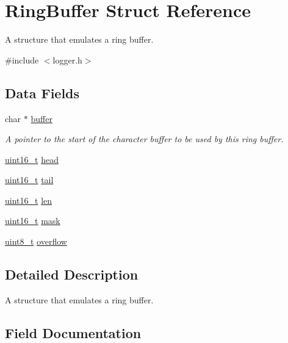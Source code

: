 \hypertarget{structRingBuffer}{\section{\-Ring\-Buffer \-Struct \-Reference}
\label{structRingBuffer}
}


\-A structure that emulates a ring buffer.  




{\ttfamily \#include $<$logger.\-h$>$}

\subsection*{\-Data \-Fields}
\begin{DoxyCompactItemize}
\item 
char $\ast$ \hyperlink{structRingBuffer_aab96a16b4002b0b6c5a633f04116fb26}{buffer}
\begin{DoxyCompactList}\small\item\em \-A pointer to the start of the character buffer to be used by this ring buffer. \end{DoxyCompactList}\item 
\hyperlink{typedefs_8h_a1f1825b69244eb3ad2c7165ddc99c956}{uint16\-\_\-t} \hyperlink{structRingBuffer_a8c9823e492bfbf2cbeac47842a016064}{head}
\item 
\hyperlink{typedefs_8h_a1f1825b69244eb3ad2c7165ddc99c956}{uint16\-\_\-t} \hyperlink{structRingBuffer_aa2c8753c26e7a2641f6ee9f4464455e8}{tail}
\item 
\hyperlink{typedefs_8h_a1f1825b69244eb3ad2c7165ddc99c956}{uint16\-\_\-t} \hyperlink{structRingBuffer_a923fbf140b33a972b4a9ee600d3b2c8f}{len}
\item 
\hyperlink{typedefs_8h_a1f1825b69244eb3ad2c7165ddc99c956}{uint16\-\_\-t} \hyperlink{structRingBuffer_a1a2bdd08c426bd4721d7c3d6f68c93d6}{mask}
\item 
\hyperlink{typedefs_8h_aba7bc1797add20fe3efdf37ced1182c5}{uint8\-\_\-t} \hyperlink{structRingBuffer_a2477690ded4ea57e830d91c05bf5ae70}{overflow}
\end{DoxyCompactItemize}


\subsection{\-Detailed \-Description}
\-A structure that emulates a ring buffer. 

\subsection{\-Field \-Documentation}
\hypertarget{structRingBuffer_aab96a16b4002b0b6c5a633f04116fb26}{
\subsubsection[{buffer}]{}}\label{structRingBuffer_aab96a16b4002b0b6c5a633f04116fb26}


